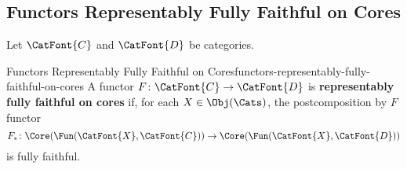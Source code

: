 \subsection{Functors Representably Fully Faithful on Cores}\label{subsection-functors-representably-fully-faithful-on-cores}
Let $\CatFont{C}$ and $\CatFont{D}$ be categories.
\begin{definition}{Functors Representably Fully Faithful on Cores}{functors-representably-fully-faithful-on-cores}%
    A functor $F\colon\CatFont{C}\to\CatFont{D}$ is \textbf{representably fully faithful on cores} if, for each $X\in\Obj(\Cats)$, the postcomposition by $F$ functor
    \[
        F_{*}%
        \colon%
        \Core(\Fun(\CatFont{X},\CatFont{C}))%
        \to
        \Core(\Fun(\CatFont{X},\CatFont{D}))%
    \]%
    is fully faithful.
\end{definition}
